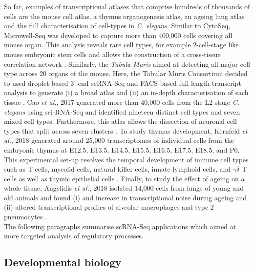 So far, examples of transcriptional atlases that comprise hundreds of thousands of cells are the mouse cell atlas, a thymus organogenesis atlas, an ageing lung atlas and the full characterisation of cell-types in \textit{C. elegans}. Similar to CytoSeq, Microwell-Seq was developed to capture more than 400,000 cells covering all mouse organ. This analysis reveals rare cell types, for example 2-cell-stage like mouse embryonic stem cells and allows the construction of a cross-tissue correlation network \cite{Han2018}. Similarly, the \emph{Tabula Muris} aimed at detecting all major cell type across 20 organs of the mouse. Here, the Tabular Muris Consortium decided to used droplet-based 3'-end scRNA-Seq and FACS-based full length transcript analysis to generate (i) a broad atlas and (ii) an in-depth characterisation of each tissue \citep{Quake2018}. Cao \emph{et al.}, 2017 generated more than 40,000 cells from the L2 stage \emph{C. elegans} using sci-RNA-Seq and identified nineteen distinct cell types and seven mixed cell types. Furthermore, this atlas allows the dissection of neuronal cell types that split across seven clusters \citep{Cao2017}. To study thymus development, Kernfeld \emph{et al.}, 2018 generated around 25,000 transcriptomes of individual cells from the embryonic thymus at E12.5, E13.5, E14.5, E15.5, E16.5, E17.5, E18.5, and P0. This experimental set-up resolves the temporal development of immune cell types such as T cells, myeolid cells, natural killer cells, innate lymphoid cells, and $\gamma{}\delta{}$ T cells as well as thymic epithelial cells \citep{Kernfeld2018}. Finally, to study the effect of ageing on a whole tissue, Angelidis \emph{et al.}, 2018 isolated 14,000 cells from lungs of young and old animals and found (i) and increase in transcriptional noise during ageing and (ii) altered transcriptional profiles of alveolar macrophages and type 2 pneumocytes \citep{Angelidis2018}.\\

The following paragraphs summarise scRNA-Seq applications which aimed at more targeted analysis of regulatory processes.

\subsection{Developmental biology}

